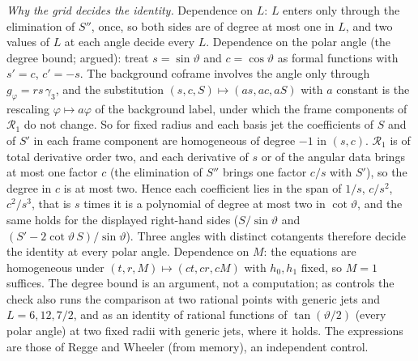 \emph{Why the grid decides the identity.} Dependence on $L$: $L$ enters only through the elimination of $S''$, once, so both sides are of degree at most one in $L$, and two values of $L$ at each angle decide every $L$. Dependence on the polar angle (the degree bound; argued): treat $s = \sin\vartheta$ and $c = \cos\vartheta$ as formal functions with $s' = c$, $c' = -s$. The background coframe involves the angle only through $g_{\varphi} = rs\,\gamma_{3}$, and the substitution $(s, c, S) \mapsto (as, ac, aS)$ with $a$ constant is the rescaling $\varphi \mapsto a\varphi$ of the background label, under which the frame components of $\mathcal{R}_{1}$ do not change. So for fixed radius and each basis jet the coefficients of $S$ and of $S'$ in each frame component are homogeneous of degree $-1$ in $(s, c)$. $\mathcal{R}_{1}$ is of total derivative order two, and each derivative of $s$ or of the angular data brings at most one factor $c$ (the elimination of $S''$ brings one factor $c/s$ with $S'$), so the degree in $c$ is at most two. Hence each coefficient lies in the span of $1/s$, $c/s^{2}$, $c^{2}/s^{3}$, that is $s$ times it is a polynomial of degree at most two in $\cot\vartheta$, and the same holds for the displayed right-hand sides ($S/\sin\vartheta$ and $(S' - 2\cot\vartheta\,S)/\sin\vartheta$). Three angles with distinct cotangents therefore decide the identity at every polar angle. Dependence on $M$: the equations are homogeneous under $(t, r, M) \mapsto (ct, cr, cM)$ with $h_{0}, h_{1}$ fixed, so $M = 1$ suffices. The degree bound is an argument, not a computation; as controls the check also runs the comparison at two rational points with generic jets and $L = 6, 12, 7/2$, and as an identity of rational functions of $\tan(\vartheta/2)$ (every polar angle) at two fixed radii with generic jets, where it holds. The expressions are those of Regge and Wheeler (from memory), an independent control.

